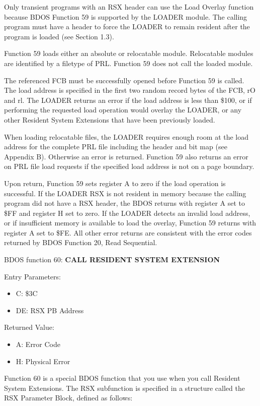 Only transient programs with an RSX header can use the Load Overlay
function because BDOS Function 59 is supported by the LOADER
module. The calling program must have a header to force the LOADER to
remain resident after the program is loaded (see Section 1.3).

Function 59 loads either an absolute or relocatable
module. Relocatable modules are identified by a filetype of
PRL. Function 59 does not call the loaded module.

The referenced FCB must be successfully opened before Function 59 is
called. The load address is specified in the first two random record
bytes of the FCB, rO and rl.  The LOADER returns an error if the load
address is less than \$100, or if performing the requested load
operation would overlay the LOADER, or any other Resident System
Extensions that have been previously loaded.

When loading relocatable files, the LOADER requires enough room at the
load address for the complete PRL file including the header and bit
map (see Appendix B).  Otherwise an error is returned. Function 59
also returns an error on PRL file load requests if the specified load
address is not on a page boundary.

Upon return, Function 59 sets register A to zero if the load operation
is successful.  If the LOADER RSX is not resident in memory because
the calling program did not have a RSX header, the BDOS returns with
register A set to \$FF and register H set to zero. If the LOADER
detects an invalid load address, or if insufficient memory is
available to load the overlay, Function 59 returns with register A set
to \$FE. All other error returns are consistent with the error codes
returned by BDOS Function 20, Read Sequential.

BDOS function 60: \textbf{CALL RESIDENT SYSTEM EXTENSION}

Entry Parameters:
\begin{itemize}
\item[] C: \$3C
\item[] DE: RSX PB Address
\end{itemize}

Returned Value:
\begin{itemize}
\item[] A: Error Code
\item[] H: Physical Error
\end{itemize}

Function 60 is a special BDOS function that you use when you call
Resident System Extensions. The RSX subfunction is specified in a
structure called the RSX Parameter Block, defined as follows:

